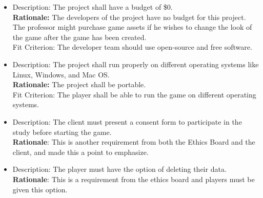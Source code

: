 \documentclass{article}
\begin{document}
\begin{itemize}
    \item Description: The project shall have a budget of \$0.\\
    \textbf{Rationale:} The developers of the project have no budget for this project. The professor might purchase game assets if he wishes to change the look of the game after the game has been created.\\ 
    Fit Criterion: The developer team should use open-source and free software.
    \item Description: The project shall run properly on different operating systems like Linux, Windows, and Mac OS.\\
    \textbf{Rationale:} The project shall be portable.\\
    Fit Criterion: The player shall be able to run the game on different operating systems.
    \item Description: The client must present a consent form to participate in the study before starting the game.\\
    \textbf{Rationale}: This is another requirement from both the Ethics Board and the client, and made this a point to emphasize.
    \item Description: The player must have the option of deleting their data.\\
    \textbf{Rationale}: This is a requirement from the ethics board and players must be given this option.
    
\end{itemize}
\end{document}
